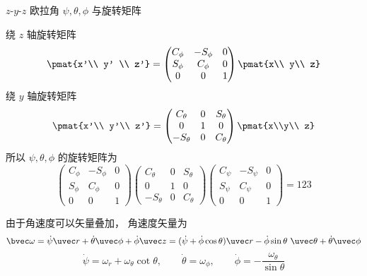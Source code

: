 
\begin{issues}
\issueDraft
\end{issues}

$z$-$y$-$z$ 欧拉角 $\psi,\theta,\phi$ 与旋转矩阵

绕 $z$ 轴旋转矩阵
\begin{equation}
\pmat{x'\\ y' \\ z'} =
\begin{pmatrix}
C_\phi & - S_\phi & 0\\
S_\phi &C_\phi & 0\\
0 & 0 & 1
\end{pmatrix}\pmat{x\\ y\\ z}
\end{equation}
绕 $y$ 轴旋转矩阵
\begin{equation}
\pmat{x'\\ y'\\ z'} =
\begin{pmatrix}
C_\theta & 0 & S_\theta\\
0 & 1 & 0\\
-S_\theta & 0 & C_\theta
\end{pmatrix}\pmat{x\\y\\ z}
\end{equation}
所以 $\psi,\theta,\phi$ 的旋转矩阵为
\begin{equation}
\begin{pmatrix}
C_\phi & - S_\phi & 0\\
S_\phi &C_\phi & 0\\
0 & 0 & 1
\end{pmatrix}
\begin{pmatrix}
C_\theta & 0 & S_\theta\\
0 & 1 & 0\\
-S_\theta & 0 & C_\theta
\end{pmatrix}
\begin{pmatrix}
C_\psi & - S_\psi & 0\\
S_\psi &C_\psi & 0\\
0 & 0 & 1
\end{pmatrix}
=
123
\end{equation}



由于角速度可以矢量叠加， 角速度矢量为
\begin{equation}
\bvec\omega
= \dot\psi\uvec r + \dot\theta\uvec\phi + \dot\phi\uvec z
= (\dot\psi + \dot\phi\cos\theta)\uvec r - \dot\phi\sin\theta\ \uvec\theta +
 \dot\theta\uvec\phi
\end{equation}
\begin{equation}
\dot\psi = \omega_r + \omega_\theta \cot\theta,\qquad
\dot\theta = \omega_\phi,\qquad
\dot\phi = -\frac{\omega_\theta}{\sin\theta}
\end{equation}

